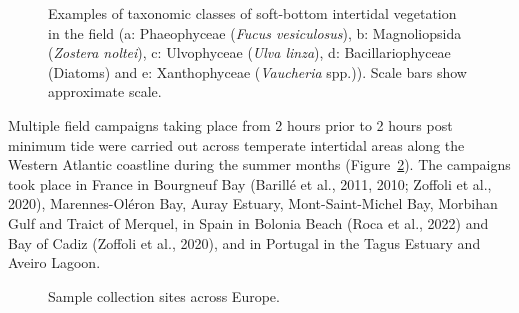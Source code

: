 \documentclass[
  letterpaper,
  11pt,
  english,
  singlespacing,
  headsepline]{MastersDoctoralThesis}
\begin{document}
\begin{spacing}{1.5}
\begin{figure}
{}

\caption{\label{fig-Images}Examples of taxonomic classes of soft-bottom
intertidal vegetation in the field (a: Phaeophyceae (\emph{Fucus
vesiculosus}), b: Magnoliopsida (\emph{Zostera noltei}), c: Ulvophyceae
(\emph{Ulva linza}), d: Bacillariophyceae (Diatoms) and e: Xanthophyceae
(\emph{Vaucheria} spp.)). Scale bars show approximate scale.}

\end{figure}%

Multiple field campaigns taking place from 2 hours prior to 2 hours post
minimum tide were carried out across temperate intertidal areas along
the Western Atlantic coastline during the summer months
(Figure~\ref{fig-FIGMAP}). The campaigns took place in France in
Bourgneuf Bay (Barillé et al., 2011, 2010; Zoffoli et al., 2020),
Marennes-Oléron Bay, Auray Estuary, Mont-Saint-Michel Bay, Morbihan Gulf
and Traict of Merquel, in Spain in Bolonia Beach (Roca et al., 2022) and
Bay of Cadiz (Zoffoli et al., 2020), and in Portugal in the Tagus
Estuary and Aveiro Lagoon.

\begin{figure}


\caption{\label{fig-FIGMAP}Sample collection sites across Europe.}


\end{figure}
\end{spacing}
\end{document}

